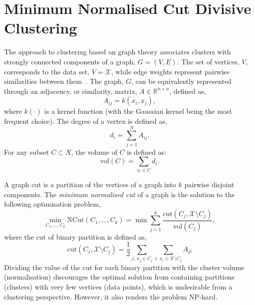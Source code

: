 \documentclass{book}
\def\R{\mathbb{R}}
\begin{document}
%

%

\section{Minimum Normalised Cut Divisive Clustering}

The approach to clustering based on graph theory associates clusters with strongly
connected components of a graph, $G = (V,E)$\/. The set of vertices, $V$, corresponds
to the data set, $V=\mathcal{X}$, while edge weights represent pairwise
similarities between them~\cite{Luxburg2007}.
%
The graph, $G$, can be equivalently represented through an adjacency, or similarity, matrix, $A \in
\R^{n \times n}$, defined as,
%
\begin{equation}\label{eq:A}
%
A_{ij} = k(x_i, x_j),
%
\end{equation}
%
where $k(\cdot)$ is a kernel function (with the Gaussian kernel being the most frequent choice).
%
The degree of a vertex is defined as,
%
\[ d_i = \sum_{j=1}^N A_{ij}.\]
%
%
For any subset $C \subset X$, 
%
%
the volume of $C$ is defined as:
%
\[ \textrm{vol}(C) = \sum_{x_i \in C} d_i.\]
%

A graph cut is a partition of the vertices of a graph into $k$ pairwise
disjoint components. The \emph{minimum normalised cut} of a graph is the
solution to the following optimisation problem,
%
\begin{equation}\label{eq:ncut}
%
\min_{C_1,\ldots, C_k} \textrm{NCut}(C_1,\ldots,C_k) = \min \sum_{j=1}^k \frac{\mathrm{cut}\left(C_j, \mathcal{X} \setminus
C_j \right)}{\textrm{vol}(C_j)}, 
%
\end{equation}
%
where the cut of binary partition is defined as,
%
\begin{equation*}
\textrm{cut}\left(C_j, \mathcal{X} \setminus C_j \right) = \frac{1}{2} 
\sum_{j:\, x_j \in C_j} \sum_{i:\, x_i \in \mathcal{X} \setminus C_j} A_{ji}
%
\end{equation*}
%
Dividing the value of the cut for each binary partition
with the cluster volume
(normalisation) discourages the optimal
solution from containing partitions (clusters) with very few vertices (data points), which
is undesirable from a clustering perspective.
%
However, it also renders the problem NP-hard.
\end{document}
